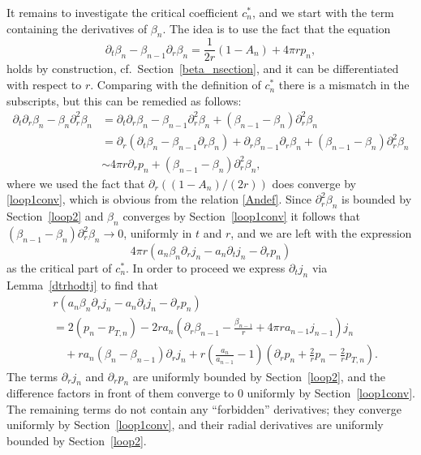 \documentclass[11pt]{article}
\begin{document}
It remains to investigate the critical coefficient $c_{n}^\ast$,
and we start with the term containing the derivatives of $\beta_n$.
The idea is to use the fact that the equation
\[
\partial_t\beta_n-\beta_{n-1} \partial_r\beta_n = \frac{1}{2r}(1-A_n)+4\pi r p_n,
\]
holds by construction, cf.~Section~\ref{beta_nsection},
and it can be differentiated with respect
to $r$. Comparing with the definition of $c_{n}^\ast$ there
is a mismatch in the subscripts,
but this can be remedied as follows:
\begin{align*}
  \partial_t\partial_r\beta_n-\beta_{n} \partial_r^2\beta_n
  &= \partial_t\partial_r\beta_n-\beta_{n-1} \partial_r^2\beta_n
  + (\beta_{n-1}-\beta_n)\partial_r^2\beta_n\\
  &= \partial_r\left(\partial_t\beta_n-\beta_{n-1} \partial_r\beta_n\right) +
  \partial_r\beta_{n-1}\partial_r\beta_n +
  (\beta_{n-1}-\beta_n)\partial_r^2\beta_n\\
  &\sim 4\pi r \partial_r p_n + (\beta_{n-1}-\beta_n)\partial_r^2\beta_n,
\end{align*}
where we used the fact that $\partial_r\left((1-A_n)/(2r)\right)$
does converge by \ref{loop1conv}, which is obvious from the relation
\eqref{Andef}. Since $\partial_r^2\beta_n$ is bounded by Section~\ref{loop2}
and $\beta_n$ converges by Section~\ref{loop1conv}
it follows that $(\beta_{n-1}-\beta_n)\partial_r^2\beta_n\to 0$,
uniformly in $t$ and $r$, and we are left with the expression
\[
4\pi r\left(a_n \beta_n \partial_r j_n - a_n \partial_t j_n
- \partial_r p_n\right)
\]
as the critical part of $c_n^\ast$. In order to proceed we express
$\partial_t j_n$ via Lemma~\ref{dtrhodtj} to find that
\begin{align*}
  & r\left(a_n \beta_n \partial_r j_n - a_n \partial_t j_n
  - \partial_r p_n\right)\\
  &=
  2 \left(p_n - p_{T,n}\right) 
  - 2 r a_n
  \left(\partial_r \beta_{n-1} -\frac{\beta_{n-1}}{r}
  + 4\pi r a_{n-1} j_{n-1}\right) j_n\\
  &\quad {}
  + r a_n (\beta_n - \beta_{n-1}) \partial_r j_n
  + r \left(\frac{a_n}{a_{n-1}}-1\right)
  \left(\partial_r p_n +\frac{2}{r} p_n - \frac{2}{r} p_{T,n}\right).
\end{align*}
The terms $\partial_r j_n$ and $\partial_r p_n$
are uniformly bounded by Section~\ref{loop2},
and the difference factors
in front of them converge to $0$ uniformly by Section~\ref{loop1conv}.
The remaining terms do not
contain any ``forbidden'' derivatives; they converge uniformly by
Section~\ref{loop1conv},
and their radial derivatives are uniformly bounded by Section~\ref{loop2}.
\end{document}
